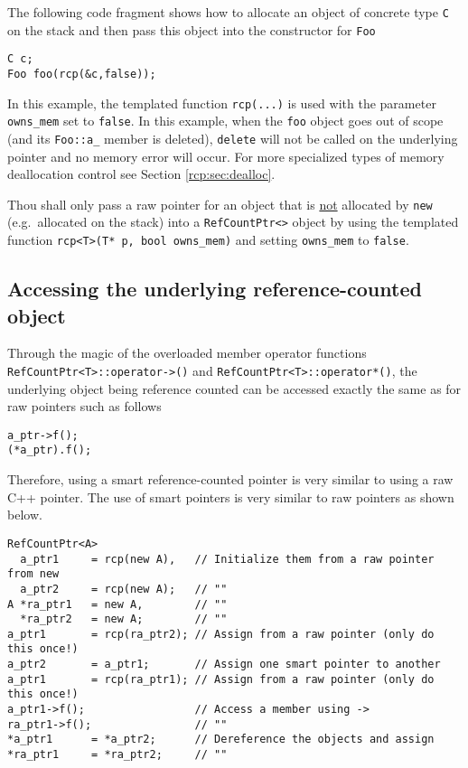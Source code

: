 The following code fragment shows how to allocate an object of concrete
type {}\texttt{C} on the stack and then pass this object into the constructor
for {}\texttt{Foo}

{\scriptsize\begin{verbatim}
C c;
Foo foo(rcp(&c,false));
\end{verbatim}}

In this example, the templated function {}\texttt{rcp(...)} is used
with the parameter {}\texttt{owns\_mem} set to {}\texttt{false}.  In
this example, when the {}\texttt{foo} object goes out of scope (and
its {}\texttt{Foo::a\_} member is deleted), {}\texttt{delete} will not
be called on the underlying pointer and no memory error will occur.
For more specialized types of memory deallocation control see Section
{}\ref{rcp:sec:dealloc}.

\begin{commandment}
Thou shall only pass a raw pointer for an object that is
\underline{not} allocated by {}\texttt{new} (e.g.~allocated on the stack) into a
{}\texttt{Ref\-Count\-Ptr<>} object by using the templated function
{}\texttt{rcp<T>(T* p, bool owns\_mem)} and setting {}\texttt{owns\_mem} to
{}\texttt{false}.
\end{commandment}

%
\subsection{Accessing the underlying reference-counted object}
%

Through the magic of the overloaded member operator functions
{}\texttt{RefCountPtr<T>::operator->()} and
{}\texttt{RefCountPtr<T>::operator*()}, the underlying object being reference
counted can be accessed exactly the same as for raw pointers such as
follows

{\scriptsize\begin{verbatim}
a_ptr->f();
(*a_ptr).f();
\end{verbatim}}

Therefore, using a smart reference-counted pointer is very similar to
using a raw C++ pointer.  The use of smart pointers is very similar
to raw pointers as shown below.

{\scriptsize\begin{verbatim}
RefCountPtr<A>
  a_ptr1     = rcp(new A),   // Initialize them from a raw pointer from new
  a_ptr2     = rcp(new A);   // ""
A *ra_ptr1   = new A,        // ""
  *ra_ptr2   = new A;        // ""
a_ptr1       = rcp(ra_ptr2); // Assign from a raw pointer (only do this once!)
a_ptr2       = a_ptr1;       // Assign one smart pointer to another
a_ptr1       = rcp(ra_ptr1); // Assign from a raw pointer (only do this once!)
a_ptr1->f();                 // Access a member using ->
ra_ptr1->f();                // ""
*a_ptr1      = *a_ptr2;      // Dereference the objects and assign
*ra_ptr1     = *ra_ptr2;     // "" 
\end{verbatim}}

